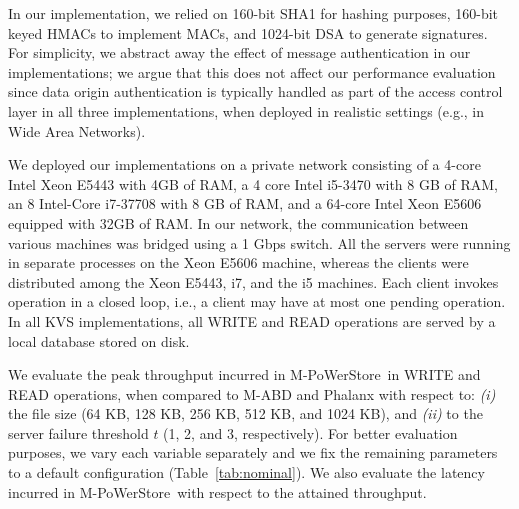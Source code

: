 \documentclass[10pt,conference,compsocconf]{IEEEtran}
\newcommand{\mprotocol}{M-PoWerStore}
\begin{document}
In our implementation, we relied on 160-bit SHA1 for hashing purposes, 160-bit keyed HMACs to implement MACs, and 1024-bit DSA to generate signatures. For simplicity, we abstract away the effect of message authentication in our implementations; we argue that this does not affect our performance evaluation since data origin authentication is typically handled as part of the access control layer in all three implementations, when deployed in realistic settings (e.g., in Wide Area Networks).

We deployed our implementations on a private network consisting of a 4-core Intel Xeon E5443 with 4GB of RAM, a 4 core Intel i5-3470 with 8 GB of RAM,
an 8 Intel-Core i7-37708 with 8 GB of RAM, and a 64-core Intel Xeon E5606 equipped with 32GB of RAM. In our network, the communication between various machines was bridged
using a 1 Gbps switch. All the servers were running in separate processes on the Xeon E5606 machine, whereas the clients were distributed among the Xeon E5443, i7, and the i5 machines. Each client invokes operation in a closed loop, i.e., a client may have at most one pending operation. In all KVS implementations,  all \textsc{WRITE} and \textsc{READ} operations are served by a local database stored on disk.


We evaluate the peak throughput incurred in \mprotocol\ in \textsc{WRITE} and \textsc{READ} operations, when compared to M-ABD and Phalanx with respect to: \emph{(i)} the file size (64 KB, 128 KB, 256 KB, 512 KB, and 1024 KB), and \emph{(ii)}
to the server failure threshold $t$ (1, 2, and 3, respectively). For better evaluation purposes, we vary each variable separately and we fix
the remaining parameters to a default configuration (Table~\ref{tab:nominal}).
We also evaluate the latency incurred in \mprotocol\ with respect to the attained throughput.










\begin{table}
\centering
{}
\caption{Default parameters used in evaluation.}
\vspace{-1 em}
\label{tab:nominal}
\end{table}
\end{document}

